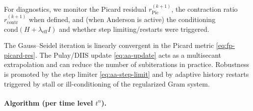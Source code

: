 For diagnostics, we monitor the Picard residual $r_{\mathrm{Pic}}^{(k+1)}$, the contraction ratio $r_{\mathrm{contr}}^{(k+1)}$ when defined, and (when Anderson is active) the conditioning $\mathrm{cond}(H+\lambda_{\mathrm{eff}}I)$ and whether step limiting/restarts were triggered.

The Gauss--Seidel iteration is linearly convergent in the Picard metric \eqref{eq:fp-picard-res}. The Pulay/DIIS update \eqref{eq:aa-update} acts as a multisecant extrapolation and can reduce the number of subiterations in practice. Robustness is promoted by the step limiter \eqref{eq:aa-step-limit} and by adaptive history restarts triggered by stall or ill-conditioning of the regularized Gram system.

\paragraph{Algorithm (per time level $t^n$).}
